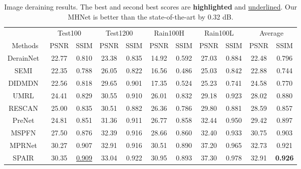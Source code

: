 \documentclass[lettersize,journal]{IEEEtran}
\begin{document}
 
\begin{table*}
\centering
\caption{Image deraining results. The best and second best scores are \textbf{highlighted} and \underline{underlined}. Our MHNet is better than the state-of-the-art by 0.32 dB. }\label{tb:derain}
\begin{tabular}{ccccccccc||cc}
    \hline
    \multicolumn{1}{c}{} & \multicolumn{2}{c}{Test100~\cite{Test100}}  & \multicolumn{2}{c}{Test1200~\cite{MSPFN}} & \multicolumn{2}{c}{Rain100H~\cite{Rain100}} & \multicolumn{2}{c||}{Rain100L~\cite{Rain100}} & \multicolumn{2}{c}{Average} 
    \\
   Methods &PSNR  &  SSIM   & PSNR  & SSIM  &PSNR  &SSIM  & PSNR &SSIM  &PSNR  & SSIM 
    \\
    \hline\hline
    DerainNet~\cite{DerainNet}  & 22.77 & 0.810  & 23.38  & 0.835  & 14.92 &  0.592  & 27.03 & 0.884 & 22.48 & 0.796 
    \\
     SEMI~\cite{semi}  & 22.35  & 0.788  & 26.05 & 0.822  & 16.56 &  0.486 & 25.03 & 0.842 & 22.88  & 0.744 
     \\
    DIDMDN~\cite{DIDMDN} & 22.56 & 0.818  & 29.65 & 0.901  & 17.35 &  0.524 &25.23 & 0.741 & 24.58  & 0.770
     \\
    UMRL~\cite{UMRL}  & 24.41 &0.829 & 30.55 &  0.910   & 26.01 & 0.832 & 29.18 & 0.923& 28.02  & 0.880 
       \\
    RESCAN~\cite{RESCAN}  & 25.00 & 0.835 & 30.51 & 0.882  &26.36 & 0.786 & 29.80 &0.881 & 28.59  & 0.857
       \\
     PreNet~\cite{PREnet}  & 24.81 &0.851 & 31.36&  0.911   & 26.77 & 0.858  &32.44 & 0.950 &29.42  & 0.897 
    \\
   MSPFN~\cite{MSPFN}  & 27.50 & 0.876 & 32.39 &  0.916   & 28.66 & 0.860  & 32.40 & 0.933 & 30.75  & 0.903
       \\
     MPRNet~\cite{Zamir2021MPRNet}  & 30.27 & 0.907 & 32.91 &  0.916   & 30.51 & 0.890  & 37.20 & 0.965 & 32.73 & 0.921
       \\
     SPAIR~\cite{SPAIR}  & 30.35 & \underline{0.909} & 33.04 &  0.922   & 30.95 & 0.893  & 37.30 & 0.978& 32.91 & \textbf{0.926}
     \\
    

\end{tabular}
\end{table*}
\end{document}
